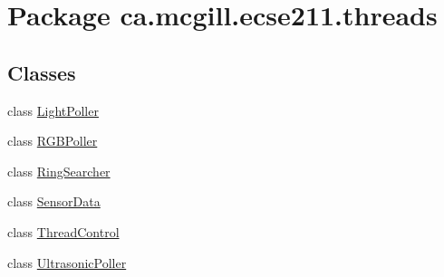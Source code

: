 \hypertarget{namespaceca_1_1mcgill_1_1ecse211_1_1threads}{}\section{Package ca.\+mcgill.\+ecse211.\+threads}
\label{namespaceca_1_1mcgill_1_1ecse211_1_1threads}
\subsection*{Classes}
\begin{DoxyCompactItemize}
\item 
class \hyperlink{classca_1_1mcgill_1_1ecse211_1_1threads_1_1_light_poller}{Light\+Poller}
\item 
class \hyperlink{classca_1_1mcgill_1_1ecse211_1_1threads_1_1_r_g_b_poller}{R\+G\+B\+Poller}
\item 
class \hyperlink{classca_1_1mcgill_1_1ecse211_1_1threads_1_1_ring_searcher}{Ring\+Searcher}
\item 
class \hyperlink{classca_1_1mcgill_1_1ecse211_1_1threads_1_1_sensor_data}{Sensor\+Data}
\item 
class \hyperlink{classca_1_1mcgill_1_1ecse211_1_1threads_1_1_thread_control}{Thread\+Control}
\item 
class \hyperlink{classca_1_1mcgill_1_1ecse211_1_1threads_1_1_ultrasonic_poller}{Ultrasonic\+Poller}
\end{DoxyCompactItemize}
